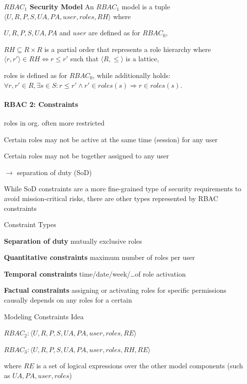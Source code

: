 \documentclass[a4paper]{article}
\renewcommand{\note}[2]{\begin{noteBox} \textbf{#1} #2 \end{noteBox}}
\begin{document}
\begin{multicols}{3}
    \note{$RBAC_1$ Security Model}{An $RBAC_1$ model is a tuple $\langle U,R,P,S,UA,PA,user,roles,RH\rangle$ where
        \begin{itemize*}
            \item $U,R,P,S,UA,PA$ and $user$ are defined as for $RBAC_0$,
            \item $RH\subseteq R\times R$ is a partial order that represents a role hierarchy where $\langle r,r'\rangle \in RH\Leftrightarrow r\leq r'$ such that $\langle R,\leq\rangle$ is a lattice,
            \item roles is defined as for $RBAC_0$, while additionally holds: $\forall r,r'\in R,\exists s\in S:r\leq r'\wedge r'\in roles(s)\Rightarrow r\in roles(s)$.
        \end{itemize*}
    }

    \paragraph{RBAC 2: Constraints}
    roles in org. often more restricted
    \begin{itemize*}
        \item Certain roles may not be active at the same time (session) for any user
        \item Certain roles may not be together assigned to any user
        \item[$\rightarrow$] separation of duty (SoD)
        \item While SoD constraints are a more fine-grained type of security requirements to avoid mission-critical risks, there are other types represented by RBAC constraints
    \end{itemize*}
    Constraint Types
    \begin{itemize*}
        \item \textbf{Separation of duty} mutually exclusive roles
        \item \textbf{Quantitative constraints} maximum number of roles per user
        \item \textbf{Temporal constraints} time/date/week/\dots  of role activation
        \item \textbf{Factual constraints} assigning or activating roles for specific permissions causally depends on any roles for a certain
    \end{itemize*}
    Modeling Constraints Idea
    \begin{itemize*}
        \item $RBAC_2: \langle U,R,P,S,UA,PA,user,roles,RE\rangle$
        \item $RBAC_3: \langle U,R,P,S,UA,PA,user,roles,RH,RE\rangle$
        \item where $RE$ is a set of logical expressions over the other model components (such as $UA,PA,user,roles$)
    \end{itemize*}


\end{multicols}
\end{document}

